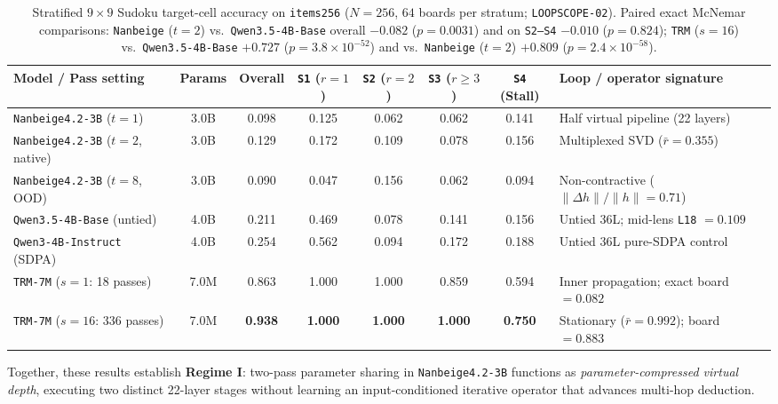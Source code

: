 \documentclass[10pt,letterpaper]{article}
\begin{document}
\begin{table}[t]
\centering
\small
\begin{tabularx}{\linewidth}{@{}lcccccc>{\raggedright\arraybackslash}X@{}}
\toprule
Model / Pass setting & Params & Overall & \texttt{S1} ($r{=}1$) & \texttt{S2} ($r{=}2$) & \texttt{S3} ($r{\ge}3$) & \texttt{S4} (Stall) & Loop / operator signature \\
\midrule
\texttt{Nanbeige4.2-3B} ($t=1$) & 3.0B & 0.098 & 0.125 & 0.062 & 0.062 & 0.141 & Half virtual pipeline (22 layers) \\
\texttt{Nanbeige4.2-3B} ($t=2$, native) & 3.0B & 0.129 & 0.172 & 0.109 & 0.078 & 0.156 & Multiplexed SVD ($\bar{r}=0.355$) \\
\texttt{Nanbeige4.2-3B} ($t=8$, OOD) & 3.0B & 0.090 & 0.047 & 0.156 & 0.062 & 0.094 & Non-contractive ($\|\Delta h\|/\|h\|=0.71$) \\
\texttt{Qwen3.5-4B-Base} (untied) & 4.0B & 0.211 & 0.469 & 0.078 & 0.141 & 0.156 & Untied 36L; mid-lens \texttt{L18} $= 0.109$ \\
\texttt{Qwen3-4B-Instruct} (SDPA) & 4.0B & 0.254 & 0.562 & 0.094 & 0.172 & 0.188 & Untied 36L pure-SDPA control \\
\midrule
\texttt{TRM-7M} ($s=1$: 18 passes) & 7.0M & 0.863 & 1.000 & 1.000 & 0.859 & 0.594 & Inner propagation; exact board $= 0.082$ \\
\texttt{TRM-7M} ($s=16$: 336 passes) & 7.0M & \textbf{0.938} & \textbf{1.000} & \textbf{1.000} & \textbf{1.000} & \textbf{0.750} & Stationary ($\bar{r}=0.992$); board $= \mathbf{0.883}$ \\
\bottomrule
\end{tabularx}
\caption{Stratified $9\times 9$ Sudoku target-cell accuracy on \texttt{items256} ($N=256$, $64$ boards per stratum; \texttt{LOOPSCOPE-02}). Paired exact McNemar comparisons: \texttt{Nanbeige} ($t=2$) vs.\ \texttt{Qwen3.5-4B-Base} overall $-0.082$ ($p=0.0031$) and on \texttt{S2--S4} $-0.010$ ($p=0.824$); \texttt{TRM} ($s=16$) vs.\ \texttt{Qwen3.5-4B-Base} $+0.727$ ($p=3.8\times 10^{-52}$) and vs.\ \texttt{Nanbeige} ($t=2$) $+0.809$ ($p=2.4\times 10^{-58}$).}
\label{tab:sudoku_triangulation}
\end{table}

Together, these results establish \textbf{Regime I}: two-pass parameter sharing in \texttt{Nanbeige4.2-3B} functions as \emph{parameter-compressed virtual depth}, executing two distinct 22-layer stages without learning an input-conditioned iterative operator that advances multi-hop deduction.
\end{document}
